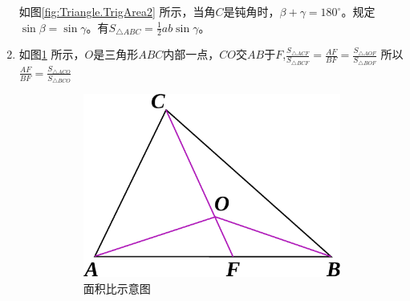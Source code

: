 \documentclass[12pt]{article}
\begin{document}
\begin{enumerate}
如图\ref{fig:Triangle.TrigArea2} 所示，当角$C$是钝角时，$\beta+\gamma=180^{\circ}$。规定$\sin\beta=\sin\gamma$。有$S_{\triangle ABC}=\frac{1}{2}ab\sin\gamma$。

\item 
如图\ref{fig:Cevas_theorem_0} 所示，$O$是三角形$ABC$内部一点，$CO$交$AB$于$F$,$\frac{S_{\triangle ACF}}{S_{\triangle BCF}}=\frac{AF}{BF}=\frac{S_{\triangle AOF}}{S_{\triangle BOF}}$
所以$\frac{AF}{BF}=\frac{S_{\triangle ACO}}{S_{\triangle BCO}}$

    \begin{figure}[!ht]
    \centering
    \begin{subfigure}[b]{0.31\textwidth}
    \includegraphics[width=\textwidth]{Cevas_theorem_0.eps}
    \caption{面积比示意图}\label{fig:Cevas_theorem_0}
    \end{subfigure}~
    \begin{subfigure}[b]{0.31\textwidth}


\end{subfigure}
\end{figure}
\end{enumerate}
\end{document}

